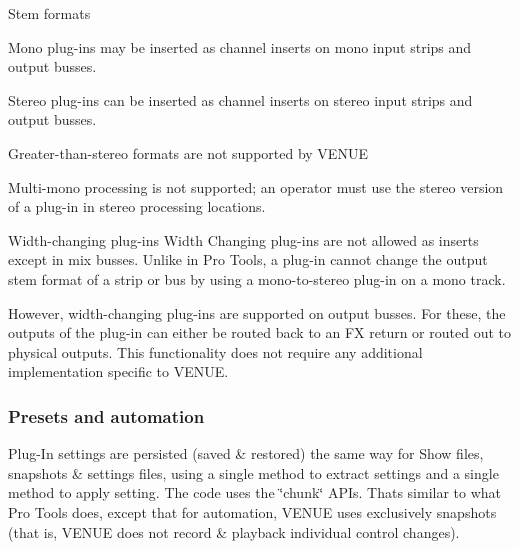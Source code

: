  Stem formats 
\begin{DoxyItemize}
\item Mono plug-\/ins may be inserted as channel inserts on mono input strips and output busses. 
\item Stereo plug-\/ins can be inserted as channel inserts on stereo input strips and output busses. 
\item Greater-\/than-\/stereo formats are not supported by V\+E\+N\+U\+E 
\item Multi-\/mono processing is not supported; an operator must use the stereo version of a plug-\/in in stereo processing locations. 
\end{DoxyItemize}

 Width-\/changing plug-\/ins Width Changing plug-\/ins are not allowed as inserts except in mix busses. Unlike in Pro Tools, a plug-\/in cannot change the output stem format of a strip or bus by using a mono-\/to-\/stereo plug-\/in on a mono track.

 However, width-\/changing plug-\/ins are supported on output busses. For these, the outputs of the plug-\/in can either be routed back to an F\+X return or routed out to physical outputs. This functionality does not require any additional implementation specific to V\+E\+N\+U\+E.

\hypertarget{a00377_subsection__aax_venue_guide__features__presets}{}\subsubsection{Presets and automation}\label{a00377_subsection__aax_venue_guide__features__presets}
 Plug-\/\+In settings are persisted (saved \& restored) the same way for Show files, snapshots \& settings files, using a single method to extract settings and a single method to apply setting. The code uses the \char`\"{}chunk\char`\"{} A\+P\+Is. That\textquotesingle{}s similar to what Pro Tools does, except that for automation, V\+E\+N\+U\+E uses exclusively snapshots (that is, V\+E\+N\+U\+E does not record \& playback individual control changes).

